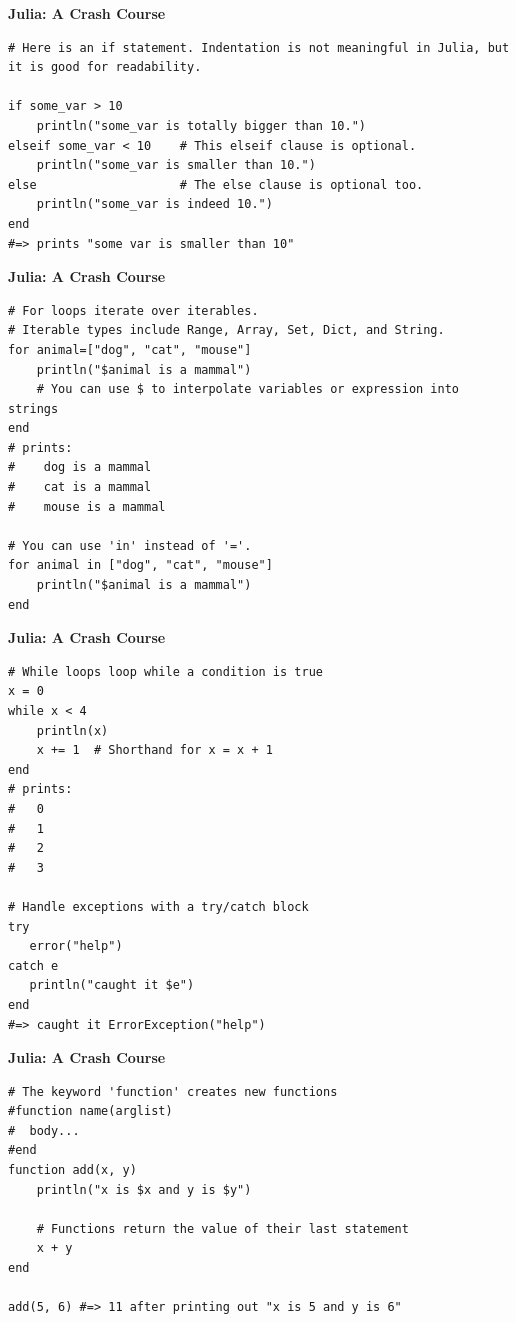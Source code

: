 \documentclass[xcolor=dvipsnames]{beamer}
\begin{document}
\begin{frame}[fragile]
{\bf Julia: A Crash Course}
\begin{lstlisting}
# Here is an if statement. Indentation is not meaningful in Julia, but it is good for readability.

if some_var > 10
    println("some_var is totally bigger than 10.")
elseif some_var < 10    # This elseif clause is optional.
    println("some_var is smaller than 10.")
else                    # The else clause is optional too.
    println("some_var is indeed 10.")
end
#=> prints "some var is smaller than 10"
\end{lstlisting}
\end{frame}

\begin{frame}[fragile]
{\bf Julia: A Crash Course}
\begin{lstlisting}
# For loops iterate over iterables.
# Iterable types include Range, Array, Set, Dict, and String.
for animal=["dog", "cat", "mouse"]
    println("$animal is a mammal")
    # You can use $ to interpolate variables or expression into strings
end
# prints:
#    dog is a mammal
#    cat is a mammal
#    mouse is a mammal

# You can use 'in' instead of '='.
for animal in ["dog", "cat", "mouse"]
    println("$animal is a mammal")
end
\end{lstlisting}
\end{frame}

\begin{frame}[fragile]
{\bf Julia: A Crash Course}
\begin{lstlisting}
# While loops loop while a condition is true
x = 0
while x < 4
    println(x)
    x += 1  # Shorthand for x = x + 1
end
# prints:
#   0
#   1
#   2
#   3

# Handle exceptions with a try/catch block
try
   error("help")
catch e
   println("caught it $e")
end
#=> caught it ErrorException("help")
\end{lstlisting}
\end{frame}

\begin{frame}[fragile]
{\bf Julia: A Crash Course}
\begin{lstlisting}
# The keyword 'function' creates new functions
#function name(arglist)
#  body...
#end
function add(x, y)
    println("x is $x and y is $y")

    # Functions return the value of their last statement
    x + y
end

add(5, 6) #=> 11 after printing out "x is 5 and y is 6"
\end{lstlisting}
\end{frame}
\end{document}
